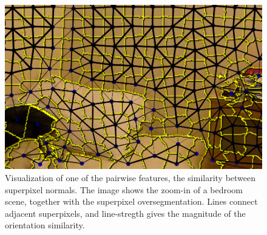 \documentclass[a4paper, 10pt, conference]{ieeeconf}      %
\begin{document}
\begin{figure}
    \begin{center}
        \includegraphics[width=\linewidth]{images/normal_feature}
    \end{center}
    \caption{%
        Visualization of one of the pairwise features, the similarity between superpixel normals.
        The image shows the zoom-in of a bedroom scene, together with the superpixel oversegmentation.
        Lines connect adjacent superpixels, and line-stregth gives the magnitude of the orientation similarity.
    }
\end{figure}
\end{document}
